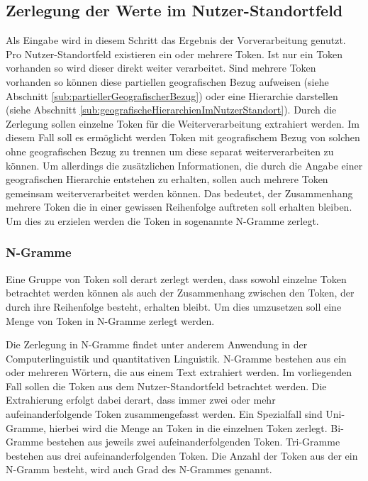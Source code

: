 		\subsection{Zerlegung der Werte im Nutzer-Standortfeld} 

			Als Eingabe wird in diesem Schritt das Ergebnis der Vorverarbeitung genutzt. 
			Pro Nutzer-Standortfeld existieren ein oder mehrere Token. 
			Ist nur ein Token vorhanden so wird dieser direkt weiter verarbeitet.
			Sind mehrere Token vorhanden so können diese partiellen geografischen Bezug aufweisen (siehe Abschnitt \ref{sub:partiellerGeografischerBezug}) oder eine Hierarchie darstellen (siehe Abschnitt \ref{sub:geografischeHierarchienImNutzerStandort}).
			Durch die Zerlegung sollen einzelne Token für die Weiterverarbeitung extrahiert werden.
			Im diesem Fall soll es ermöglicht werden Token mit geografischem Bezug von solchen ohne geografischen Bezug zu trennen um diese separat weiterverarbeiten zu können.
			Um allerdings die zusätzlichen Informationen, die durch die Angabe einer geografischen Hierarchie entstehen zu erhalten, sollen auch mehrere Token gemeinsam weiterverarbeitet werden können.
			Das bedeutet, der Zusammenhang mehrere Token die in einer gewissen Reihenfolge auftreten soll erhalten bleiben. 
			Um dies zu erzielen werden die Token in sogenannte N-Gramme zerlegt. 

			\subsubsection{N-Gramme}

				Eine Gruppe von Token soll derart zerlegt werden, dass sowohl einzelne Token betrachtet werden können als auch der Zusammenhang zwischen den Token, der durch ihre Reihenfolge  besteht, erhalten bleibt.
				Um dies umzusetzen soll eine Menge von Token in N-Gramme zerlegt werden.

				Die Zerlegung in N-Gramme findet unter anderem Anwendung in der Computerlinguistik und quantitativen Linguistik.
				N-Gramme bestehen aus ein oder mehreren Wörtern, die aus einem Text extrahiert werden. 
				Im vorliegenden Fall sollen die Token aus dem Nutzer-Standortfeld betrachtet werden.
				Die Extrahierung erfolgt dabei derart, dass immer zwei oder mehr aufeinanderfolgende Token zusammengefasst werden.    
				Ein Spezialfall sind Uni-Gramme, hierbei wird die Menge an Token in die einzelnen Token zerlegt.
				Bi-Gramme bestehen aus jeweils zwei aufeinanderfolgenden Token.
				Tri-Gramme bestehen aus drei aufeinanderfolgenden Token. 
				Die Anzahl der Token aus der ein N-Gramm besteht, wird auch Grad des N-Grammes genannt.

